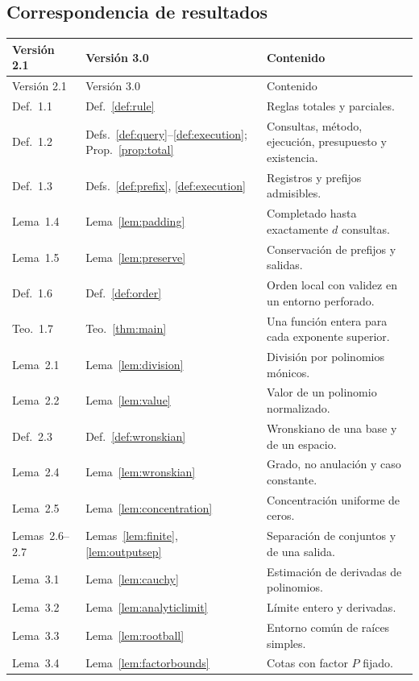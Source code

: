 \documentclass[11pt,a4paper]{article}
\numberwithin{equation}{section}
\theoremstyle{definition}
\theoremstyle{remark}
\begin{document}
\subsection{Correspondencia de resultados}
\small
\begin{longtable}{@{}>{\raggedright\arraybackslash}p{}>{\raggedright\arraybackslash}p{}>{\raggedright\arraybackslash}p{}@{}}
\toprule
Versión 2.1 & Versión 3.0 & Contenido\\
\midrule
\endfirsthead
\toprule
Versión 2.1 & Versión 3.0 & Contenido\\
\midrule
\endhead
Def.~1.1 & Def.~\ref{def:rule} & Reglas totales y parciales.\\
Def.~1.2 & Defs.~\ref{def:query}--\ref{def:execution}; Prop.~\ref{prop:total} & Consultas, método, ejecución, presupuesto y existencia.\\
Def.~1.3 & Defs.~\ref{def:prefix}, \ref{def:execution} & Registros y prefijos admisibles.\\
Lema~1.4 & Lema~\ref{lem:padding} & Completado hasta exactamente $d$ consultas.\\
Lema~1.5 & Lema~\ref{lem:preserve} & Conservación de prefijos y salidas.\\
Def.~1.6 & Def.~\ref{def:order} & Orden local con validez en un entorno perforado.\\
Teo.~1.7 & Teo.~\ref{thm:main} & Una función entera para cada exponente superior.\\
Lema~2.1 & Lema~\ref{lem:division} & División por polinomios mónicos.\\
Lema~2.2 & Lema~\ref{lem:value} & Valor de un polinomio normalizado.\\
Def.~2.3 & Def.~\ref{def:wronskian} & Wronskiano de una base y de un espacio.\\
Lema~2.4 & Lema~\ref{lem:wronskian} & Grado, no anulación y caso constante.\\
Lema~2.5 & Lema~\ref{lem:concentration} & Concentración uniforme de ceros.\\
Lemas~2.6--2.7 & Lemas~\ref{lem:finite}, \ref{lem:outputsep} & Separación de conjuntos y de una salida.\\
Lema~3.1 & Lema~\ref{lem:cauchy} & Estimación de derivadas de polinomios.\\
Lema~3.2 & Lema~\ref{lem:analyticlimit} & Límite entero y derivadas.\\
Lema~3.3 & Lema~\ref{lem:rootball} & Entorno común de raíces simples.\\
Lema~3.4 & Lema~\ref{lem:factorbounds} & Cotas con factor $P$ fijado.\\

\end{longtable}
\end{document}
